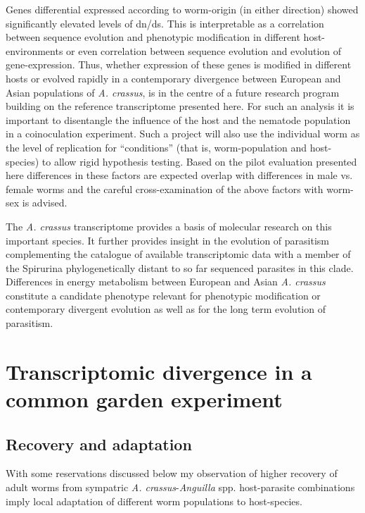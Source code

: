 Genes differential expressed according to worm-origin (in either
direction) showed significantly elevated levels of dn/ds. This is
interpretable as a correlation between sequence evolution and
phenotypic modification in different host-environments or even
correlation between sequence evolution and evolution of
gene-expression. Thus, whether expression of these genes is modified
in different hosts or evolved rapidly in a contemporary divergence
between European and Asian populations of \textit{A. crassus}, is in
the centre of a future research program building on the reference
transcriptome presented here. For such an analysis it is important to
disentangle the influence of the host and the nematode population in a
coinoculation experiment. Such a project will also use the individual
worm as the level of replication for ``conditions'' (that is,
worm-population and host-species) to allow rigid hypothesis
testing. Based on the pilot evaluation presented here differences in
these factors are expected overlap with differences in male vs. female
worms and the careful cross-examination of the above factors with
worm-sex is advised.

The \textit{A. crassus} transcriptome provides a basis of molecular
research on this important species. It further provides insight in the
evolution of parasitism complementing the catalogue of available
transcriptomic data with a member of the Spirurina phylogenetically
distant to so far sequenced parasites in this clade. Differences in
energy metabolism between European and Asian \textit{A. crassus}
constitute a candidate phenotype relevant for phenotypic modification
or contemporary divergent evolution as well as for the long term
evolution of parasitism.

\newpage

\section{Transcriptomic divergence in a common garden experiment}
\label{sec:exp-inf}


\subsection{Recovery and adaptation}
\label{sec:recovery}

With some reservations discussed below my observation of higher
recovery of adult worms from sympatric
\textit{A. crassus}-\textit{Anguilla} spp. host-parasite combinations
imply local adaptation of different worm populations to host-species.

